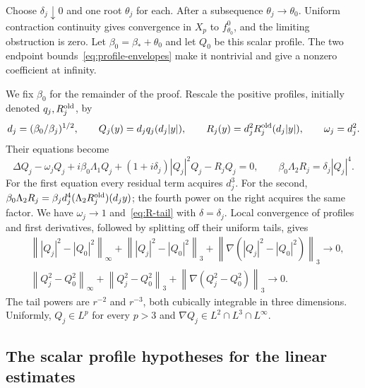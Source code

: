 \documentclass[11pt]{article}
\numberwithin{equation}{section}
\theoremstyle{remark}
\newcommand{\norm}[1]{\left\|#1\right\|}
\newcommand{\Lam}[1]{\Lambda_{#1}}
\begin{document}
Choose $\delta_j\downarrow0$ and one root $\theta_j$ for each.
After a subsequence $\theta_j\to\theta_0$. Uniform contraction continuity
gives convergence in $X_p$ to $f_{\theta_0}^0$, and the limiting obstruction
is zero. Let $\beta_0=\beta_*+\theta_0$ and let $Q_0$ be this scalar
profile. The two endpoint bounds~\eqref{eq:profile-envelopes} make it
nontrivial and give a nonzero coefficient at infinity.

We fix $\beta_0$ for the remainder of the proof. Rescale the positive
profiles, initially denoted $q_j,R_j^{\rm old}$, by
\[
 d_j=(\beta_0/\beta_j)^{1/2},\qquad
 Q_j(y)=d_jq_j(d_j|y|),\qquad
 R_j(y)=d_j^2R_j^{\rm old}(d_j|y|),\qquad \omega_j=d_j^2.
\]
Their equations become
\begin{equation}\label{eq:rescaled-profiles}
 \Delta Q_j-\omega_jQ_j+i\beta_0\Lam1 Q_j
 +(1+i\delta_j)|Q_j|^2Q_j-R_jQ_j=0,
 \qquad \beta_0\Lam2 R_j=\delta_j|Q_j|^4.
\end{equation}
For the first equation every residual term acquires $d_j^3$.
For the second,
$\beta_0\Lam2 R_j=\beta_jd_j^4(\Lam2 R_j^{\rm old})(d_jy)$;
the fourth power on the right acquires the same factor.
We have $\omega_j\to1$ and~\eqref{eq:R-tail} with $\delta=\delta_j$.
Local convergence of profiles and first derivatives, followed by splitting
off their uniform tails, gives
\begin{equation}\label{eq:coefficient-convergence}
 \begin{split}
 &\norm{|Q_j|^2-|Q_0|^2}_\infty+
 \norm{|Q_j|^2-|Q_0|^2}_3+
 \norm{\nabla(|Q_j|^2-|Q_0|^2)}_3\longrightarrow0,\\
 &\norm{Q_j^2-Q_0^2}_\infty+
 \norm{Q_j^2-Q_0^2}_3+
 \norm{\nabla(Q_j^2-Q_0^2)}_3\longrightarrow0.
 \end{split}
\end{equation}
The tail powers are $r^{-2}$ and $r^{-3}$, both cubically integrable in
three dimensions. Uniformly, $Q_j\in L^p$ for every $p>3$ and
$\nabla Q_j\in L^2\cap L^3\cap L^\infty$.

\subsection{The scalar profile hypotheses for the linear estimates}
\label{subsec:scalar-tail}
\end{document}
